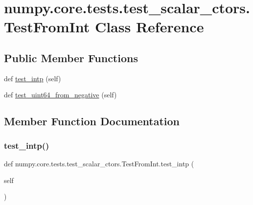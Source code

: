 \hypertarget{classnumpy_1_1core_1_1tests_1_1test__scalar__ctors_1_1TestFromInt}{}\section{numpy.\+core.\+tests.\+test\+\_\+scalar\+\_\+ctors.\+Test\+From\+Int Class Reference}
\label{classnumpy_1_1core_1_1tests_1_1test__scalar__ctors_1_1TestFromInt}
\subsection*{Public Member Functions}
\begin{DoxyCompactItemize}
\item 
def \hyperlink{classnumpy_1_1core_1_1tests_1_1test__scalar__ctors_1_1TestFromInt_aeebd782b20dc095c3743c59ce4e4baea}{test\+\_\+intp} (self)
\item 
def \hyperlink{classnumpy_1_1core_1_1tests_1_1test__scalar__ctors_1_1TestFromInt_a0d2ad9e42edf4022c9e0ce4fbd50676f}{test\+\_\+uint64\+\_\+from\+\_\+negative} (self)
\end{DoxyCompactItemize}


\subsection{Member Function Documentation}
\mbox{\label{classnumpy_1_1core_1_1tests_1_1test__scalar__ctors_1_1TestFromInt_aeebd782b20dc095c3743c59ce4e4baea}} 
\subsubsection{\texorpdfstring{test\+\_\+intp()}{test\_intp()}}
{\footnotesize\ttfamily def numpy.\+core.\+tests.\+test\+\_\+scalar\+\_\+ctors.\+Test\+From\+Int.\+test\+\_\+intp (\begin{DoxyParamCaption}\item[{}]{self }\end{DoxyParamCaption})}

